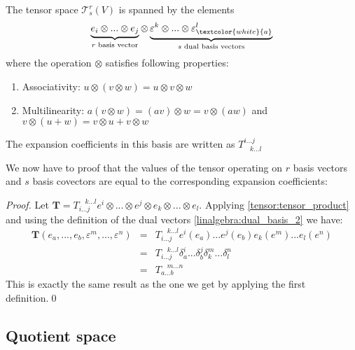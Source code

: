 	\begin{adefinition}\label{tensor:type}
    		The tensor space $\mathcal{T}^r_s(V)$ is spanned by the elements
    		\[\underbrace{e_i\otimes...\otimes e_j}_{r\text{ basis vector}}\otimes\underbrace{\varepsilon^k\otimes...\otimes \varepsilon^l_{\textcolor{white}{a}}}_{s\text{ dual basis vectors}}\]
    		where the operation $\otimes$ satisfies following properties:
        	\begin{enumerate}
        		\item Associativity: $u\otimes(v\otimes w) = u \otimes v\otimes w$
		        \item Multilinearity: $a(v\otimes w) = (av)\otimes w = v\otimes (aw)$ and $v\otimes (u+w) = v\otimes u + v\otimes w$
	        \end{enumerate}
	        The expansion coefficients in this basis are written as $T^{i...j}_{\ \ \ \ k...l}$
	\end{adefinition}

    
    	We now have to proof that the values of the tensor operating on $r$ basis vectors and $s$ basis covectors are equal to the corresponding expansion coefficients:
      	\begin{proof}
        	Let $\mathbf{T} = T_{i...j}^{\ \ \ \ k...l}e^i\otimes...\otimes e^j\otimes e_k\otimes...\otimes e_l$. Applying \ref{tensor:tensor_product} and using the definition of the dual vectors \ref{linalgebra:dual_basis_2} we have:
		\[
            	\begin{array}{ccl}
            		\mathbf{T}(e_a, ..., e_b, \varepsilon^m, ..., \varepsilon^n) &=& T_{i...j}^{\ \ \ \ k...l}e^i(e_a)...e^j(e_b)e_k(e^m)...e_l(e^n)\\
                	&=& T_{i...j}^{\ \ \ \ k...l}\delta_a^i...\delta_b^j\delta_k^m...\delta_l^n\\
                	&=& T_{a...b}^{\ \ \ \ m...n}
	        \end{array}
		\]
		This is exactly the same result as the one we get by applying the first definition.\qed
      	\end{proof}

\subsection{Quotient space}

